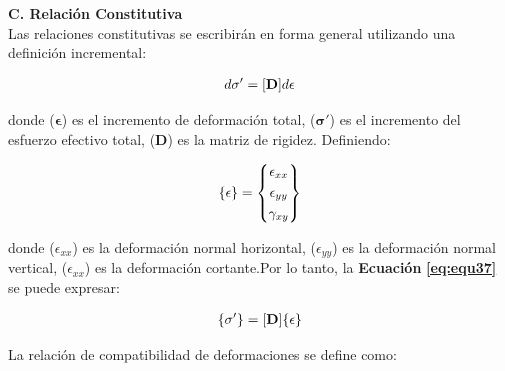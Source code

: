 \textbf{C. Relación Constitutiva}
\\
Las relaciones constitutivas se escribirán en forma general utilizando una definición incremental:
\begin{ceqn} 
\begin{gather} \label{eq:equ37} 
\normalsize{d\mathbf{\sigma}'=[\mathbf{D}] d\mathbf{\epsilon}}
\end{gather}  
\end{ceqn}
donde ($\mathbf{\epsilon}$) es el incremento de deformación total, ($\mathbf{\sigma'}$) es el incremento del esfuerzo efectivo total, ($\mathbf{D}$) es la matriz de rigidez. Definiendo:

\begin{ceqn} 
\begin{gather} \label{eq:equ38} 
\normalsize{ \{\mathbf{\epsilon}\} = \begin{Bmatrix} 
       \epsilon_{xx}\\[0.3em]
       \epsilon_{yy}\\[0.3em]
       \gamma_{xy}
       \end{Bmatrix}}
\end{gather}  
\end{ceqn}
donde ($\epsilon_{xx}$) es la deformación normal horizontal, ($\epsilon_{yy}$) es la deformación normal vertical, ($\epsilon_{xx}$) es la deformación cortante.Por lo tanto, la \textbf{Ecuación} \textbf{\ref{eq:equ37}} se puede expresar:

\begin{ceqn} 
\begin{gather} \label{eq:equ39} 
\normalsize{\{\mathbf{\sigma'}\}=[\mathbf{D}] \{\mathbf{\epsilon}\}}
\end{gather}  
\end{ceqn}

La relación de compatibilidad de deformaciones se define como:

